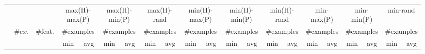 \begin{tabular}{lccrrrrrrrrrrrrrrrrrr}
\toprule
& && \multicolumn{2}{c}{max(H)-max(P)} & \multicolumn{2}{c}{max(H)-min(P)} & \multicolumn{2}{c}{max(H)-rand} & \multicolumn{2}{c}{min(H)-max(P)} & \multicolumn{2}{c}{min(H)-min(P)} & \multicolumn{2}{c}{min(H)-rand} & \multicolumn{2}{c}{min-max(P)} & \multicolumn{2}{c}{min-min(P)} & \multicolumn{2}{c}{min-rand}\\
\cmidrule(rr){4-5}\cmidrule(rr){6-7}\cmidrule(rr){8-9}\cmidrule(rr){10-11}\cmidrule(rr){12-13}\cmidrule(rr){14-15}\cmidrule(rr){16-17}\cmidrule(rr){18-19}\cmidrule(rr){20-21}
&\multirow{2}{*}{$\#ex.$} & \multirow{2}{*}{\#feat.} &  \multicolumn{2}{c}{\#examples} & \multicolumn{2}{c}{\#examples} & \multicolumn{2}{c}{\#examples} & \multicolumn{2}{c}{\#examples} & \multicolumn{2}{c}{\#examples} & \multicolumn{2}{c}{\#examples} & \multicolumn{2}{c}{\#examples} & \multicolumn{2}{c}{\#examples} & \multicolumn{2}{c}{\#examples} \\\cmidrule(rl){4-5}\cmidrule(rl){6-7}\cmidrule(rl){8-9}\cmidrule(rl){10-11}\cmidrule(rl){12-13}\cmidrule(rl){14-15}\cmidrule(rl){16-17}\cmidrule(rl){18-19}\cmidrule(rl){20-21}
&& & \multicolumn{1}{c}{min} & \multicolumn{1}{c}{avg} & \multicolumn{1}{c}{min} & \multicolumn{1}{c}{avg} & \multicolumn{1}{c}{min} & \multicolumn{1}{c}{avg} & \multicolumn{1}{c}{min} & \multicolumn{1}{c}{avg} & \multicolumn{1}{c}{min} & \multicolumn{1}{c}{avg} & \multicolumn{1}{c}{min} & \multicolumn{1}{c}{avg} & \multicolumn{1}{c}{min} & \multicolumn{1}{c}{avg} & \multicolumn{1}{c}{min} & \multicolumn{1}{c}{avg} & \multicolumn{1}{c}{min} & \multicolumn{1}{c}{avg} \\
\midrule


\end{tabular}
